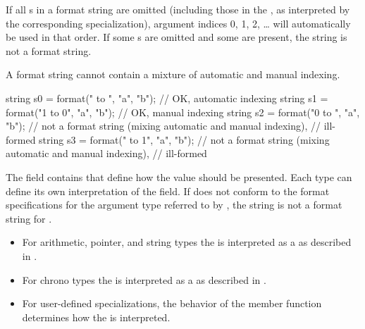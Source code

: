 \pnum
If all s in a format string are omitted
(including those in the ,
as interpreted by the corresponding  specialization),
argument indices 0, 1, 2, \ldots{} will automatically be used in that order.
If some s are omitted and some are present,
the string is not a format string.
\begin{note}
A format string cannot contain a
mixture of automatic and manual indexing.
\end{note}
\begin{example}
\begin{codeblock}
string s0 = format("{} to {}",   "a", "b"); // OK, automatic indexing
string s1 = format("{1} to {0}", "a", "b"); // OK, manual indexing
string s2 = format("{0} to {}",  "a", "b"); // not a format string (mixing automatic and manual indexing),
                                            // ill-formed
string s3 = format("{} to {1}",  "a", "b"); // not a format string (mixing automatic and manual indexing),
                                            // ill-formed
\end{codeblock}
\end{example}

\pnum
The  field contains
that define how the value should be presented.
Each type can define its own
interpretation of the  field.
If  does not conform
to the format specifications for
the argument type referred to by ,
the string is not a format string for .
\begin{example}
\begin{itemize}
\item
For arithmetic, pointer, and string types
the 
is interpreted as a 
as described in .
\item
For chrono types
the 
is interpreted as a 
as described in .
\item
For user-defined  specializations,
the behavior of the  member function
determines how the 
is interpreted.
\end{itemize}
\end{example}


